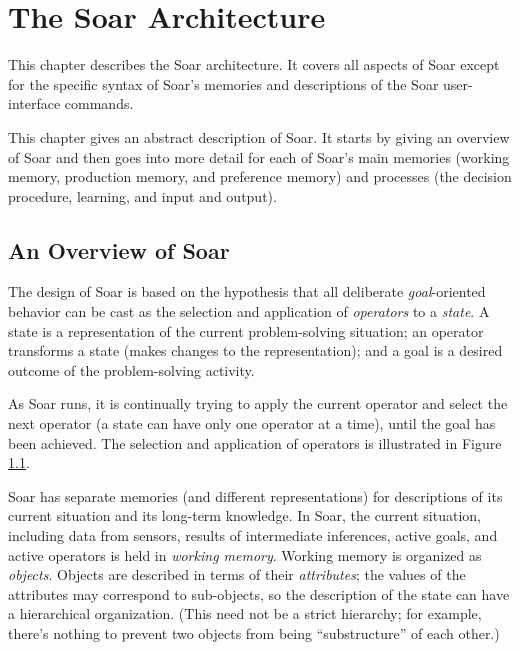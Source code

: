 \chapter{The Soar Architecture}
\label{ARCH}

This chapter describes the Soar architecture.  It covers all aspects of Soar
except for the specific syntax of Soar's memories and descriptions of the
Soar user-interface commands.

This chapter gives an abstract description of Soar.  It starts by giving
an overview of Soar and then goes into more detail for each of Soar's
main memories (working memory, production memory, and preference memory)
and processes (the decision procedure, learning, and input and output).

\section{An Overview of Soar}
\label{ARCH-overview}

The design of Soar is based on the hypothesis that all deliberate
\textit{goal}-oriented behavior can be cast as the selection and application
of \textit{operators} to a \textit{state}. A state is a representation of the
current problem-solving situation; an operator transforms a state (makes
changes to the representation); and a goal is a desired outcome of the
problem-solving activity.

As Soar runs, it is continually trying to apply the current operator and
select the next operator (a state can have only one operator at a time),
until the goal has been achieved. The selection and application of
operators is illustrated in Figure \ref{fig:select-apply}. 

\begin{figure}
\label{fig:select-apply}
\end{figure}

Soar has separate memories (and different representations) for
descriptions of its current situation and its long-term knowledge.  In
Soar, the current situation, including data from sensors, results of
intermediate inferences, active goals, and active operators is held in
\emph{working memory}.  Working memory is organized as
\emph{objects}. Objects are described in terms of their
\emph{attributes}; the values of the attributes may correspond to
sub-objects, so the description of the state can have a hierarchical
organization. (This need not be a strict hierarchy; for example, there's
nothing to prevent two objects from being ``substructure'' of each
other.)

